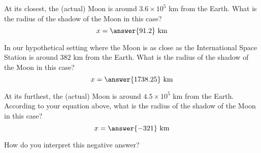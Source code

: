 \documentclass{ximera}
\begin{document}
\begin{problem}
  At its closest, the (actual) Moon is around $3.6\times 10^5$ km from
  the Earth.  What is the radius of the shadow of the Moon in this
  case?
  \[
  x = \answer{91.2} \text{ km}
  \]
\end{problem}

\begin{problem}
  In our hypothetical setting where the Moon is as close as the
  International Space Station is around $382$ km from the Earth.  What
  is the radius of the shadow of the Moon in this case?
  \[
  x = \answer{1738.25} \text{ km}
  \]
\end{problem}



\begin{problem}
  At its furthest, the (actual) Moon is around $4.5\times 10^5$ km
  from the Earth.  According to your equation above, what is the
  radius of the shadow of the Moon in this case?
  \[
  x = \answer{-321} \text{ km}
  \]
  \begin{problem}
    How do you interpret this negative answer?
    \begin{freeResponse}
    \end{freeResponse}
  \end{problem}
\end{problem}
\end{document}
